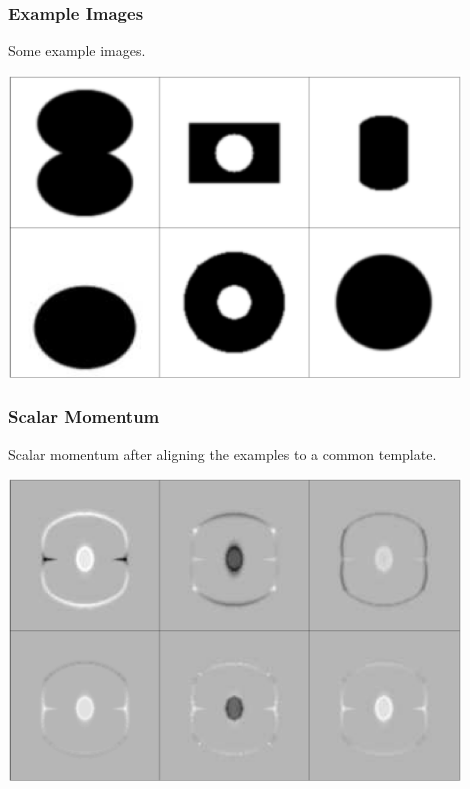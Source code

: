 
\begin{frame}
\frametitle{Example Images}
Some example images.
\begin{center}
\includegraphics[width=0.9\textwidth]{original}
\end{center}
\end{frame}


\begin{frame}
\frametitle{Scalar Momentum}
Scalar momentum after aligning the examples to a common template.
\begin{center}
\includegraphics[width=0.9\textwidth]{alpha}
\end{center}
\end{frame}



